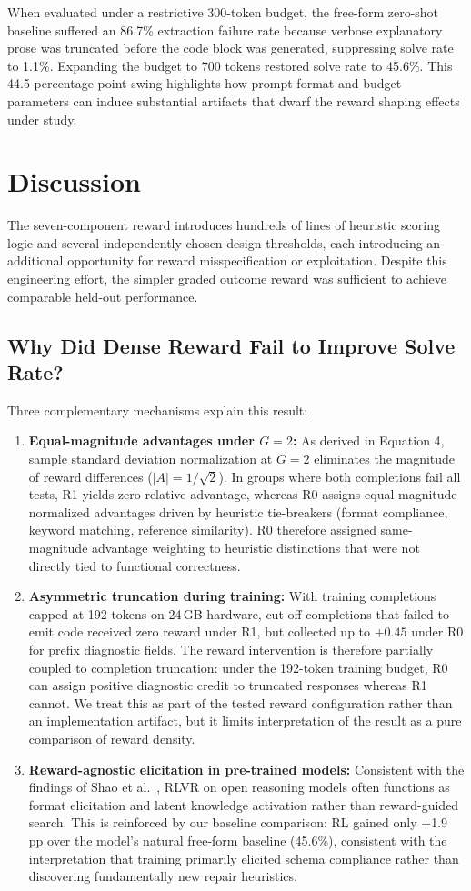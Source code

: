 \documentclass{article}
\begin{document}
When evaluated under a restrictive 300-token budget, the free-form zero-shot baseline suffered an 86.7\% extraction failure rate because verbose explanatory prose was truncated before the code block was generated, suppressing solve rate to 1.1\%. Expanding the budget to 700 tokens restored solve rate to 45.6\%. This 44.5 percentage point swing highlights how prompt format and budget parameters can induce substantial artifacts that dwarf the reward shaping effects under study.

\section{Discussion}
The seven-component reward introduces hundreds of lines of heuristic scoring logic and several independently chosen design thresholds, each introducing an additional opportunity for reward misspecification or exploitation. Despite this engineering effort, the simpler graded outcome reward was sufficient to achieve comparable held-out performance. 

\subsection{Why Did Dense Reward Fail to Improve Solve Rate?}
Three complementary mechanisms explain this result:
\begin{enumerate}
\item \textbf{Equal-magnitude advantages under $G=2$:} As derived in Equation 4, sample standard deviation normalization at $G=2$ eliminates the magnitude of reward differences ($|A| = 1/\sqrt{2}$). In groups where both completions fail all tests, R1 yields zero relative advantage, whereas R0 assigns equal-magnitude normalized advantages driven by heuristic tie-breakers (format compliance, keyword matching, reference similarity). R0 therefore assigned same-magnitude advantage weighting to heuristic distinctions that were not directly tied to functional correctness.
\item \textbf{Asymmetric truncation during training:} With training completions capped at 192 tokens on 24\,GB hardware, cut-off completions that failed to emit code received zero reward under R1, but collected up to $+0.45$ under R0 for prefix diagnostic fields. The reward intervention is therefore partially coupled to completion truncation: under the 192-token training budget, R0 can assign positive diagnostic credit to truncated responses whereas R1 cannot. We treat this as part of the tested reward configuration rather than an implementation artifact, but it limits interpretation of the result as a pure comparison of reward density.
\item \textbf{Reward-agnostic elicitation in pre-trained models:} Consistent with the findings of Shao et al.~\cite{Shao2025Spurious}, RLVR on open reasoning models often functions as format elicitation and latent knowledge activation rather than reward-guided search. This is reinforced by our baseline comparison: RL gained only +1.9 pp over the model's natural free-form baseline (45.6\%), consistent with the interpretation that training primarily elicited schema compliance rather than discovering fundamentally new repair heuristics.
\end{enumerate}
\end{document}
